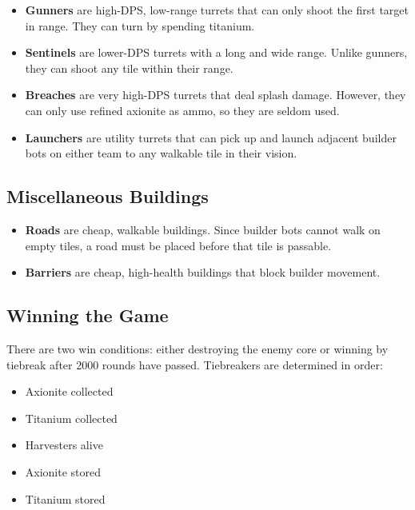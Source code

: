 \documentclass[10pt,sigconf,nonacm]{acmart}
\begin{document}
\begin{itemize}[leftmargin=*]
  \item \textbf{Gunners} are high-DPS, low-range turrets that can only shoot the first target in range. They can turn by spending titanium.

  \item \textbf{Sentinels} are lower-DPS turrets with a long and wide range. Unlike gunners, they can shoot any tile within their range.

  \item \textbf{Breaches} are very high-DPS turrets that deal splash damage. However, they can only use refined axionite as ammo, so they are seldom used.

  \item \textbf{Launchers} are utility turrets that can pick up and launch adjacent builder bots on either team to any walkable tile in their vision.
\end{itemize}

\subsection{Miscellaneous Buildings}

\begin{itemize}[leftmargin=*]
  \item \textbf{Roads} are cheap, walkable buildings. Since builder bots cannot walk on empty tiles, a road must be placed before that tile is passable.

  \item \textbf{Barriers} are cheap, high-health buildings that block builder movement.
\end{itemize}
\subsection{Winning the Game}

There are two win conditions: either destroying the enemy core or winning by tiebreak after 2000 rounds have passed. Tiebreakers are determined in order:

\begin{itemize}[leftmargin=*]
  \item Axionite collected
  \item Titanium collected
  \item Harvesters alive
  \item Axionite stored
  \item Titanium stored
\end{itemize}
\end{document}

